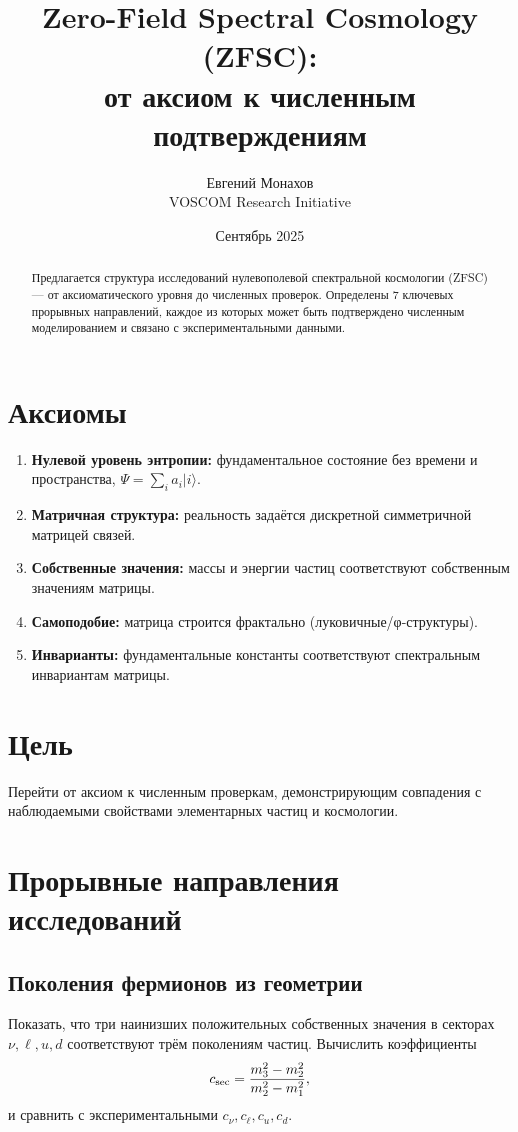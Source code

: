\documentclass[12pt,a4paper]{article}
\title{Zero-Field Spectral Cosmology (ZFSC): \\ от аксиом к численным подтверждениям}
\author{Евгений Монахов \\ VOSCOM Research Initiative}
\date{Сентябрь 2025}
\begin{document}
\maketitle

\begin{abstract}
Предлагается структура исследований нулевополевой спектральной космологии (ZFSC) --- от аксиоматического уровня до численных проверок. 
Определены 7 ключевых прорывных направлений, каждое из которых может быть подтверждено численным моделированием и связано с экспериментальными данными.
\end{abstract}

\section{Аксиомы}
\begin{enumerate}
  \item \textbf{Нулевой уровень энтропии:} фундаментальное состояние без времени и пространства, $\Psi = \sum_i a_i |i\rangle$.
  \item \textbf{Матричная структура:} реальность задаётся дискретной симметричной матрицей связей.
  \item \textbf{Собственные значения:} массы и энергии частиц соответствуют собственным значениям матрицы.
  \item \textbf{Самоподобие:} матрица строится фрактально (луковичные/φ-структуры).
  \item \textbf{Инварианты:} фундаментальные константы соответствуют спектральным инвариантам матрицы.
\end{enumerate}

\section{Цель}
Перейти от аксиом к численным проверкам, демонстрирующим совпадения с наблюдаемыми свойствами элементарных частиц и космологии.

\section{Прорывные направления исследований}

\subsection{Поколения фермионов из геометрии}
Показать, что три наинизших положительных собственных значения в секторах $\nu,\ell,u,d$ соответствуют трём поколениям частиц. 
Вычислить коэффициенты
\[
c_{\rm sec} = \frac{m_3^2 - m_2^2}{m_2^2 - m_1^2},
\]
и сравнить с экспериментальными $c_\nu, c_\ell, c_u, c_d$.
\end{document}
